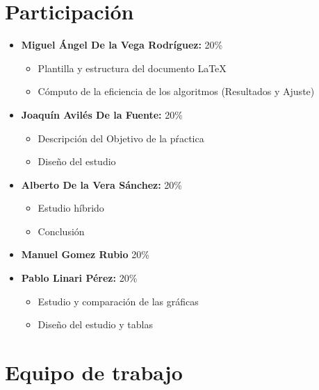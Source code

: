 \documentclass[11pt]{article}
\begin{document}
                                                

\tableofcontents %

\newpage %

\section{Participación}
\begin{itemize}
    \item \textbf{Miguel Ángel De la Vega Rodríguez:} 20\%
    \begin{itemize}
        \item Plantilla y estructura del documento \LaTeX
        \item Cómputo de la eficiencia de los algoritmos (Resultados y Ajuste)
    \end{itemize}
    \item \textbf{Joaquín Avilés De la Fuente:} 20\%
    \begin{itemize}
        \item Descripción del Objetivo de la pŕactica
        \item Diseño del estudio
    \end{itemize}
    \item \textbf{Alberto De la Vera Sánchez: } 20\%
    \begin{itemize}
        \item Estudio híbrido 
        \item Conclusión
    \end{itemize}
    \item \textbf{Manuel Gomez Rubio} 20\%
    \item \textbf{Pablo Linari Pérez:} 20\%
    \begin{itemize}
        \item Estudio y comparación de las gráficas
        \item Diseño del estudio y tablas
    \end{itemize}
\end{itemize}

\section{Equipo de trabajo}
\end{document}
